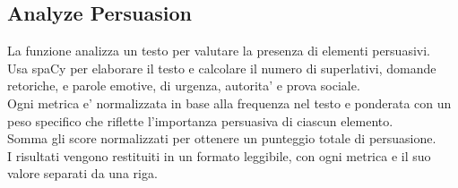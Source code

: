 \documentclass{article}
\begin{document}
		\subsection{Analyze Persuasion}
La funzione analizza un testo per valutare la presenza di elementi persuasivi. \\Usa spaCy per elaborare il testo e calcolare il numero di superlativi, domande retoriche, e parole emotive, di urgenza, autorita' e prova sociale. \\Ogni metrica e' normalizzata in base alla frequenza nel testo e ponderata con un peso specifico che riflette l'importanza persuasiva di ciascun elemento. \\Somma gli score normalizzati per ottenere un punteggio totale di persuasione. \\I risultati vengono restituiti in un formato leggibile, con ogni metrica e il suo valore separati da una riga.	
\end{document}
